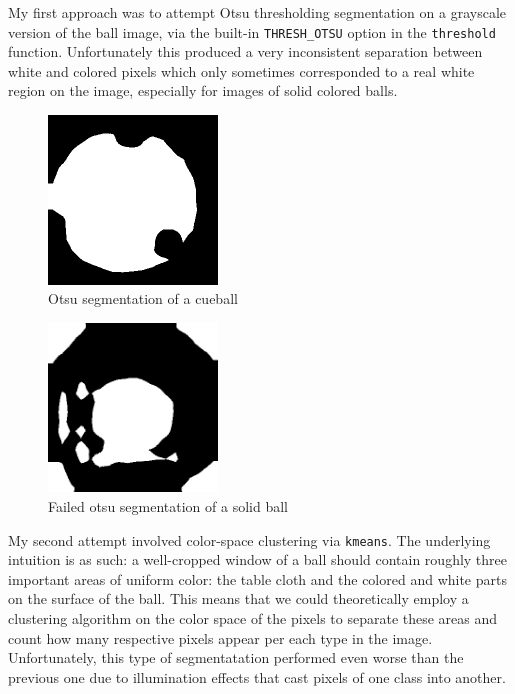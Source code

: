 My first approach was to attempt Otsu thresholding segmentation
on a grayscale version of the ball image, 
via the built-in \verb|THRESH_OTSU| option in the \verb|threshold| function.
Unfortunately this produced a very inconsistent separation between white and 
colored pixels which only sometimes corresponded to a real white region 
on the image, especially for images of solid colored balls.

\begin{figure}[h]
  \centering
  \includegraphics[width=0.4\textwidth]{./imgs/cueball_otsu.png}
  \caption{Otsu segmentation of a cueball}
\end{figure}

\begin{figure}[h]
  \centering
  \includegraphics[width=0.4\textwidth]{./imgs/bad_otsu.png}
  \caption{Failed otsu segmentation of a solid ball}
\end{figure}

My second attempt involved color-space clustering via \verb|kmeans|. 
The underlying intuition is as such: a well-cropped window of a ball should 
contain roughly three important areas of uniform color: the table cloth and 
the colored and white parts on the surface of the ball. This means that 
we could theoretically employ a clustering algorithm on the color space 
of the pixels to separate these areas and count how many respective pixels 
appear per each type in the image.  
Unfortunately, this type of segmentatation performed even worse than the 
previous one due to illumination effects that cast pixels of one class 
into another.

